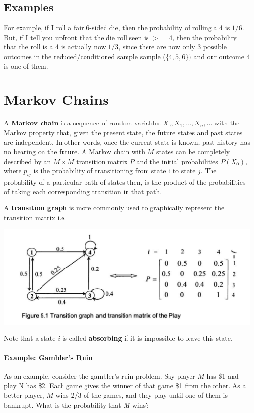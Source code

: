 \documentclass[10pt,a4paper]{article}
\begin{document}
\subsection*{Examples} For example, if I roll a fair 6-sided die, then the probability of rolling a 4 is $1/6$. But, if I tell you upfront that the die roll seen is $>= 4$, then the probability that the roll is a 4 is actually now $1/3$, since there are now only 3 possible outcomes in the reduced/conditioned sample sample ($\{4,5,6\}$) and our outcome 4 is one of them.

\section{Markov Chains}
A \textbf{Markov chain} is a sequence of random variables $X_0,X_1,\dots,X_n,\dots$ with the Markov property that, given the present state, the future states and past states are independent. In other words, once the current state is known, past history has no bearing on the future. A Markov chain with $M$ states can be completely described by an $M \times M$ transition matrix $P$ and the initial probabilities $P(X_0)$, where $p_{ij}$ is the probability of transitioning from state $i$ to state $j$. The probability of a particular path of states then, is the product of the probabilities of taking each corresponding transition in that path.

A \textbf{transition graph} is more commonly used to graphically represent the transition matrix i.e.
\begin{center}
    \includegraphics[scale=0.5]{diagrams/markov_chain_graph.png}
\end{center}
Note that a state $i$ is called \textbf{absorbing} if it is impossible to leave this state.

\paragraph*{Example: Gambler's Ruin} 
As an example, consider the gambler's ruin problem. Say player $M$ has \$1 and play N has \$2. Each game gives the winner of that game \$1 from the other. As a better player, $M$ wins 2/3 of the games, and they play until one of them is bankrupt. What is the probability that $M$ wins?
\end{document}
